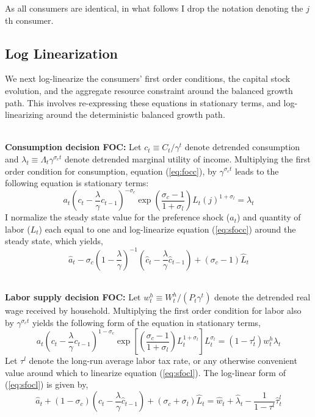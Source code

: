 \documentclass[11pt]{article}
\newcommand{\beq}{\begin{equation}}
\newcommand{\eeq}{\end{equation}}
\newcommand{\ds}{\displaystyle}
\newcommand{\eqref}[1]{(\ref{#1})}
\begin{document}
As all consumers are identical, in what follows I drop the notation denoting the $j$th consumer. 

\subsection{Log Linearization}
We next log-linearize the consumers' first order conditions, the capital stock evolution, and the aggregate resource constraint around the balanced growth path.  This involves re-expressing these equations in stationary terms, and log-linearizing around the deterministic balanced growth path.  

\ \\
\textbf{Consumption decision FOC:} Let $c_t \equiv C_t / \gamma^t$ denote detrended consumption and $\lambda_t \equiv \Lambda_t \gamma^{\sigma_c t}$ denote detrended marginal utility of income.  Multiplying the first order condition for consumption, equation \eqref{eq:focc}, by $\gamma^{\sigma_c t}$ leads to the following equation is stationary terms:
\beq \label{eq:sfocc} a_t (c_t - \frac{\lambda}{\gamma} c_{t-1})^{-\sigma_c} \exp{\left(\frac{\ds \sigma_c-1}{\ds 1+\sigma_l}\right) L_t(j)^{1+\sigma_l}} = \lambda_t \eeq
I normalize the steady state value for the preference shock ($a_t$) and quantity of labor ($L_t$) each equal to one and log-linearize equation \eqref{eq:sfocc} around the steady state, which yields,
\beq \label{eq:lnfocc} \hat{a}_t - \sigma_c(1-\frac{\lambda}{\gamma})^{-1} (\hat{c}_t - \frac{\lambda}{\gamma} \hat{c}_{t-1}) + (\sigma_c-1) \hat{L}_t \eeq

\ \\
\textbf{Labor supply decision FOC:} Let $w_t^h \equiv {W_t^h}/({P_t \gamma^t})$ denote the detrended real wage received by household.  Multiplying the first order condition for labor also by $\gamma^{\sigma_c t}$ yields the following form of the equation in stationary terms,
\beq \label{eq:sfocl} a_t (c_t - \frac{\lambda}{\gamma} c_{t-1})^{1-\sigma_c} \exp{\left[ \left(\frac{\ds \sigma_c-1}{\ds 1+\sigma_l}\right) L_t^{1+\sigma_l} \right]} L_t^{\sigma_l} = (1-\tau_t^l) w_t^h \lambda_t \eeq
Let $\tau^l$ denote the long-run average labor tax rate, or any otherwise convenient value around which to linearize equation \eqref{eq:sfocl}.  The log-linear form of \eqref{eq:sfocl} is given by,
\beq \label{eq:lnfocl} \hat{a}_t + (1-\sigma_c)(\hat{c}_t - \frac{\lambda}{\gamma}\hat{c}_{t-1}) + (\sigma_c + \sigma_l)\hat{L}_t = \hat{w}_t + \hat{\lambda}_t - \frac{1}{1-\tau^l} \hat{\tau}_t^l \eeq
\end{document}

